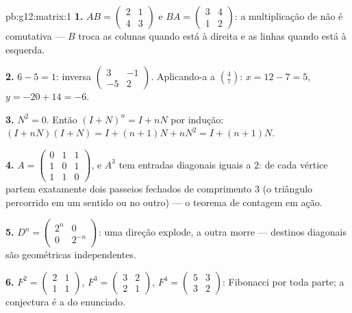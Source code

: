 \begin{solution}{pb:g12:matrix:1}
\textbf{1.} $AB = \begin{pmatrix} 2 & 1\\ 4 & 3\end{pmatrix}$
e $BA = \begin{pmatrix} 3 & 4\\ 1 & 2\end{pmatrix}$: a
multiplicação de  não é comutativa --- $B$ troca as
colunas quando está à direita e as linhas quando está à
esquerda.

\textbf{2.}  $6 - 5 = 1$: inversa
$\begin{pmatrix} 3 & -1\\ -5 & 2\end{pmatrix}$. Aplicando-a a
$\binom{4}{7}$: $x = 12 - 7 = 5$, $y = -20 + 14 = -6$.

\textbf{3.} $N^2 = 0$. Então $(I + N)^n = I + nN$ por indução:
$(I + nN)(I + N) = I + (n+1)N + nN^2 = I + (n+1)N$.

\textbf{4.} $A = \begin{pmatrix} 0&1&1\\ 1&0&1\\ 1&1&0
\end{pmatrix}$, e $A^3$ tem entradas diagonais iguais a $2$: de
cada vértice partem exatamente dois passeios fechados de
comprimento $3$ (o triângulo percorrido em um sentido ou no
outro) --- o teorema de contagem em ação.

\textbf{5.} $D^n = \begin{pmatrix} 2^n & 0\\ 0 & 2^{-n}
\end{pmatrix}$: uma direção explode, a outra morre --- destinos
diagonais são  geométricas independentes.

\textbf{6.} $F^2 = \begin{pmatrix} 2 & 1\\ 1 & 1\end{pmatrix}$,
$F^3 = \begin{pmatrix} 3 & 2\\ 2 & 1\end{pmatrix}$,
$F^4 = \begin{pmatrix} 5 & 3\\ 3 & 2\end{pmatrix}$: Fibonacci
por toda parte; a conjectura é a do enunciado.


\end{solution}
